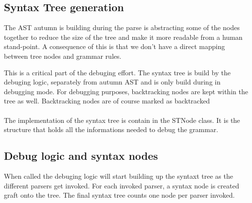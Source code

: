 
%
		\subsection{Syntax Tree generation}
%
	
	The AST autumn is building during the parse is abstracting some of the nodes together to reduce the size of the tree and make it more readable from a human stand-point. A consequence of this is that we don't have a direct mapping between tree nodes and grammar rules.

	This is a critical part of the debuging effort. The syntax tree is build by the debuging logic, separately from autumn AST and is only build during in debugging mode.
 	For debugging purposes, backtracking nodes are kept within the tree as well. Backtracking nodes are of course marked as backtracked

 	\paragraph{}

	The implementation of the syntax tree is contain in the STNode class. It is the structure that holds all the informations needed to debug the grammar.


%
		\subsection{Debug logic and syntax nodes}
%

	When called the debuging logic will start building up the syntaxt tree as the different parsers get invoked. For each invoked parser, a syntax node is created graft onto the tree. The final syntax tree counts one node per parser invoked.

